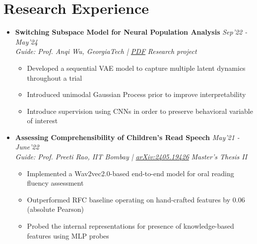 \documentclass[10pt,letterpaper,sans]{moderncv}
\providecommand{\sl}{\slshape}
\begin{document}
\section{Research Experience}
\begin{itemize}
\item \textbf{Switching Subspace Model for Neural Population Analysis} \hfill{\sl Sep'22 - May'24}\\
\textit{Guide: Prof. Anqi Wu, GeorgiaTech | \href{https://methi1999.github.io/assets/pdf/switching_subspace_model_neurips.pdf}{PDF}} \hfill{\sl Research project}\\
\vspace{-10pt}
\begin{itemize}
\item Developed a sequential VAE model to capture multiple latent dynamics throughout a trial
\item Introduced unimodal Gaussian Process prior to improve interpretability
\item Introduce supervision using CNNs in order to preserve behavioral variable of interest
\end{itemize}
\vspace{5pt}
\item \textbf{Assessing Comprehensibility of Children's Read Speech} \hfill{\sl  May'21 - June'22}\\
\textit{Guide: Prof. Preeti Rao, IIT Bombay | \href{https://arxiv.org/abs/2405.19426}{arXiv:2405.19426}} \hfill {\sl Master's Thesis II}\\
\vspace{-10pt}
\begin{itemize}
\item Implemented a Wav2vec2.0-based end-to-end model for oral reading fluency assessment
\item Outperformed RFC baseline operating on hand-crafted features by 0.06 (absolute Pearson)
\item Probed the internal representations for presence of knowledge-based features using MLP probes

\end{itemize}
\end{itemize}
\end{document}
